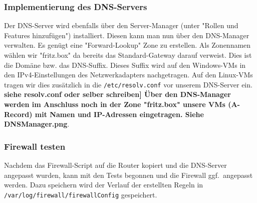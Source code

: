 \subsubsection{Implementierung des DNS-Servers}
Der DNS-Server wird ebenfalls über den Server-Manager (unter "Rollen und Features hinzufügen") installiert. Diesen kann man nun über den DNS-Manager verwalten. Es genügt eine "Forward-Lookup" Zone zu erstellen. Als Zonennamen wählen wir "fritz.box" da bereits das Standard-Gateway darauf verweist. Dies ist die Domäne bzw. das DNS-Suffix. Dieses Suffix wird auf den Windows-VMs in den IPv4-Einstellungen des Netzwerkadapters nachgetragen. Auf den Linux-VMs tragen wir dies zusätzlich in die \verb+/etc/resolv.conf+ vor unserem DNS-Server ein. \textbf{siehe resolv.conf oder selber schreiben]
Über den DNS-Manager werden im Anschluss noch in der Zone "fritz.box" unsere VMs (A-Record) mit Namen und IP-Adressen eingetragen. \textbf Siehe DNSManager.png}.
\subsubsection{Firewall testen}
Nachdem das Firewall-Script auf die Router kopiert und die DNS-Server angepasst wurden, kann mit den Tests begonnen und die Firewall ggf.\ angepasst werden. Dazu speichern wird der Verlauf der erstellten Regeln in \verb+/var/log/firewall/firewallConfig+ gespeichert.
